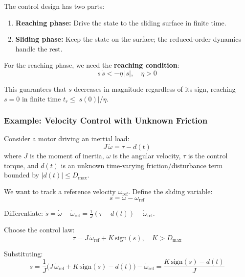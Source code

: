 The control design has two parts:
\begin{enumerate}
    \item \textbf{Reaching phase:} Drive the state to the sliding surface in finite time.
    \item \textbf{Sliding phase:} Keep the state on the surface; the reduced-order dynamics handle the rest.
\end{enumerate}

For the reaching phase, we need the \textbf{reaching condition}:
\begin{equation}
s\,\dot{s} < -\eta\,|s|, \quad \eta > 0
\end{equation}

This guarantees that $s$ decreases in magnitude regardless of its sign, reaching $s = 0$ in finite time $t_r \leq |s(0)|/\eta$.

\subsubsection{Example: Velocity Control with Unknown Friction}

Consider a motor driving an inertial load:
\begin{equation}
J\,\dot{\omega} = \tau - d(t)
\end{equation}
where $J$ is the moment of inertia, $\omega$ is the angular velocity, $\tau$ is the control torque, and $d(t)$ is an unknown time-varying friction/disturbance term bounded by $|d(t)| \leq D_{\max}$.

We want to track a reference velocity $\omega_{\text{ref}}$. Define the sliding variable:
\begin{equation}
s = \omega - \omega_{\text{ref}}
\end{equation}

Differentiate: $\dot{s} = \dot{\omega} - \dot{\omega}_{\text{ref}} = \frac{1}{J}(\tau - d(t)) - \dot{\omega}_{\text{ref}}$.

Choose the control law:
\begin{equation}
\tau = J\,\dot{\omega}_{\text{ref}} + K\,\mathrm{sign}(s), \quad K > D_{\max}
\end{equation}

Substituting:
\begin{equation}
\dot{s} = \frac{1}{J}\bigl(J\,\dot{\omega}_{\text{ref}} + K\,\mathrm{sign}(s) - d(t)\bigr) - \dot{\omega}_{\text{ref}} = \frac{K\,\mathrm{sign}(s) - d(t)}{J}
\end{equation}

